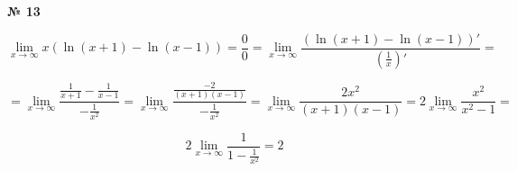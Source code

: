 \documentclass{article}
\begin{document}
\textbf{№ 13} 
\large

$$ \lim\limits_{x \to \infty} x \left( \ln{(x+1)} - \ln{(x-1)} \right)
= \frac{0}{0}
= \lim\limits_{x \to \infty} \frac{\left( \ln{(x+1)} - \ln{(x-1)} \right)'}{\left( \frac{1}{x} \right)'}
= $$

$$ = \lim\limits_{x \to \infty} \frac{\frac{1}{x+1} - \frac{1}{x-1}}{-\frac{1}{x^2}}
= \lim\limits_{x \to \infty} \frac{\frac{-2}{(x+1)(x-1)}}{-\frac{1}{x^2}} 
= \lim\limits_{x \to \infty} \frac{2x^2}{(x+1)(x-1)}
= 2 \lim\limits_{x \to \infty} \frac{x^2}{x^2-1}
= $$

$$ 2 \lim\limits_{x \to \infty} \frac{1}{1- \frac{1}{x^2}}
= 2 $$
\end{document}

